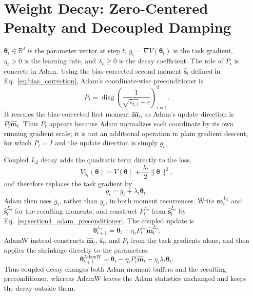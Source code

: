 \documentclass[11pt,letterpaper]{article}
\newcommand{\thet}{\bm{\theta}}
\newcommand{\R}{\mathbb{R}}
\newcommand{\diag}{\operatorname{diag}}
\begin{document}
\newpage
\section{Weight Decay: Zero-Centered Penalty and Decoupled Damping}\label{sec:weight_decay}

\(\thet_t\in\R^d\) is the parameter vector at step \(t\),
\(g_t=\nabla V(\thet_t)\) is the task gradient, \(\eta_t>0\) is the learning
rate, and \(\lambda_t\geq0\) is the decay coefficient. The role
of \(P_t\) is concrete in Adam. Using the bias-corrected second moment
\(\widehat{\bm s}_t\) defined in Eq.~\eqref{eq:bias_correction}, Adam's
coordinate-wise preconditioner is
\begin{equation}\label{eq:section4_adam_preconditioner}
  P_t
  =\diag\!\left(
    \frac{1}{\sqrt{\widehat s_{t,i}}+\epsilon}
  \right)_{i=1}^{d}.
\end{equation}
It rescales the bias-corrected first moment \(\widehat{\bm m}_t\), so Adam's
update direction is \(P_t\widehat{\bm m}_t\). Thus \(P_t\) appears because
Adam normalizes each coordinate by its own running gradient scale; it is not
an additional operation in plain gradient descent, for which \(P_t=I\) and
the update direction is simply \(g_t\).

Coupled \(L_2\) decay adds the quadratic term directly to the loss,
\begin{equation}\label{eq:section4_coupled_loss}
  V_{\lambda_t}(\thet)
  =V(\thet)+\frac{\lambda_t}{2}\lVert\thet\rVert^2,
\end{equation}
and therefore replaces the task gradient by
\begin{equation}
  \overline{g}_t=g_t+\lambda_t\thet_t.
\end{equation}
Adam then uses \(\overline{g}_t\), rather than \(g_t\), in both moment recurrences.
Write \(\widehat{\bm m}_t^{L_2}\) and \(\widehat{\bm s}_t^{L_2}\) for the
resulting moments, and construct \(P_t^{L_2}\) from
\(\widehat{\bm s}_t^{L_2}\) by Eq.~\eqref{eq:section4_adam_preconditioner}.
The coupled update is
\begin{equation}\label{eq:section4_coupled_update}
  \thet_{t+1}^{L_2}
  =\thet_t-\eta_tP_t^{L_2}\widehat{\bm m}_t^{L_2}.
\end{equation}
AdamW instead constructs \(\widehat{\bm m}_t\), \(\widehat{\bm s}_t\), and
\(P_t\) from the task gradients alone, and then applies the shrinkage directly
to the parameters:
\begin{equation}\label{eq:section4_decoupled_update}
  \thet_{t+1}^{\mathrm{AdamW}}
  =\thet_t-\eta_tP_t\widehat{\bm m}_t
   -\eta_t\lambda_t\thet_t.
\end{equation}
Thus coupled decay changes both Adam moment buffers and the resulting
preconditioner, whereas AdamW leaves the Adam statistics unchanged and keeps
the decay outside them.
\end{document}
